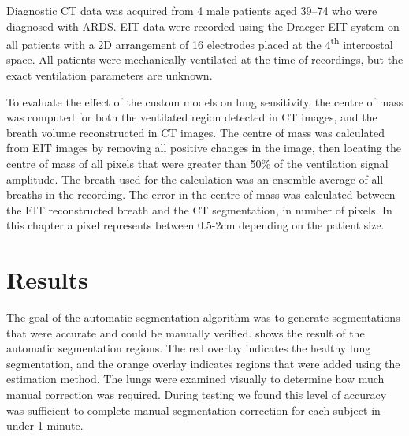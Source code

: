 Diagnostic CT data was acquired from 4 male 
patients aged 39--74 who were diagnosed with ARDS.
EIT data were recorded using the Draeger EIT system on all patients
with a 2D arrangement of 16 electrodes placed at the 
4\textsuperscript{th} intercostal space. 
All patients were mechanically ventilated
at the time of recordings, but the exact 
ventilation parameters are unknown.

To evaluate the effect of the custom models on lung sensitivity,
the centre of mass was computed for both the ventilated region detected in 
CT images, and the breath volume reconstructed in CT images. 
The centre of mass was calculated from EIT images by removing all 
positive changes in the image, then locating the centre of mass 
of all pixels that were greater than 50\% of the ventilation signal amplitude. 
The breath used for the calculation was an ensemble average
of all breaths in the recording.
The error in the centre of mass was calculated between the EIT reconstructed breath 
and the CT segmentation, in number of pixels.
In this chapter a pixel represents between 0.5-2cm depending on the patient size. 

%

\section{Results}

The goal of the automatic segmentation algorithm was to 
generate segmentations that were accurate and could be 
manually verified. 
shows the result of the automatic segmentation regions.
The red overlay indicates the healthy lung segmentation,
and the orange overlay indicates regions that were added
using the estimation method. 
The lungs were examined visually to determine 
how much manual correction was required. During testing
we found this level of accuracy was sufficient to 
complete manual segmentation correction for each subject in 
under 1 minute.

